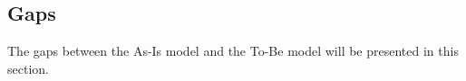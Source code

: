 \subsection{Gaps}
\label{sec:gaps}
The gaps between the As-Is model and the To-Be model will be presented in this section.
